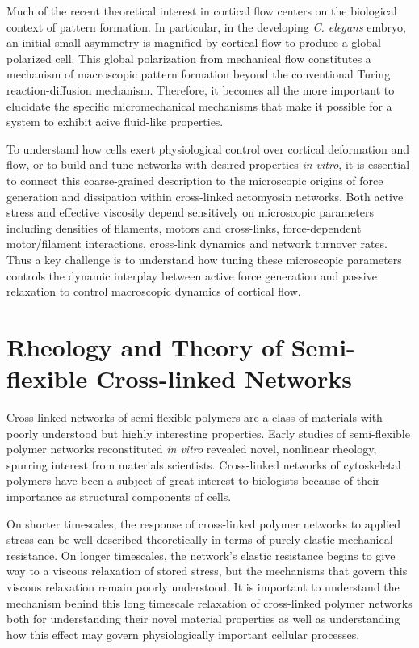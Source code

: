Much of the recent theoretical interest in cortical flow centers on the biological context of pattern formation.  In particular, in the developing \textit{C. elegans} embryo, an initial small asymmetry is magnified by cortical flow to produce a global polarized cell\cite{Munro2004413}.  This global polarization from mechanical flow constitutes a mechanism of macroscopic pattern formation beyond the conventional Turing reaction-diffusion mechanism\cite{Howard2011}. Therefore, it becomes all the more important to elucidate the specific micromechanical mechanisms that make it possible for a system to exhibit acive fluid-like properties.


To understand how cells exert physiological control over cortical deformation and flow, or to build and tune networks with desired properties {\em in vitro}, it is essential to connect this coarse-grained description to the microscopic origins of force generation and dissipation within cross-linked actomyosin networks.  Both active stress and effective viscosity depend sensitively on microscopic parameters including densities of filaments, motors and cross-links, force-dependent motor/filament interactions, cross-link dynamics and network turnover rates.  Thus a key challenge is to understand how tuning these microscopic parameters controls the dynamic interplay between active force generation and passive relaxation to control macroscopic dynamics of cortical flow.


\section{Rheology and Theory of Semi-flexible Cross-linked Networks}

Cross-linked networks of semi-flexible polymers are a class of materials with poorly understood but highly interesting properties.    Early studies of semi-flexible polymer networks reconstituted {\em in vitro} revealed novel, nonlinear rheology, spurring interest from materials scientists\cite{megareview}.  Cross-linked networks of cytoskeletal polymers have been a subject of great interest to biologists because of their importance as structural components of cells\cite{cellmech_review1,cellmech_review2}.


On shorter timescales, the response of cross-linked polymer networks to applied stress can be well-described theoretically in terms of purely elastic mechanical resistance.  On longer timescales, the network's elastic resistance begins to give way to a viscous relaxation of stored stress, but the mechanisms that govern this viscous relaxation remain poorly understood.   It is important to understand the mechanism behind this long timescale relaxation of cross-linked polymer networks both for understanding their novel material properties as well as understanding how this effect may govern physiologically important cellular processes\cite{cell_rheo}.



